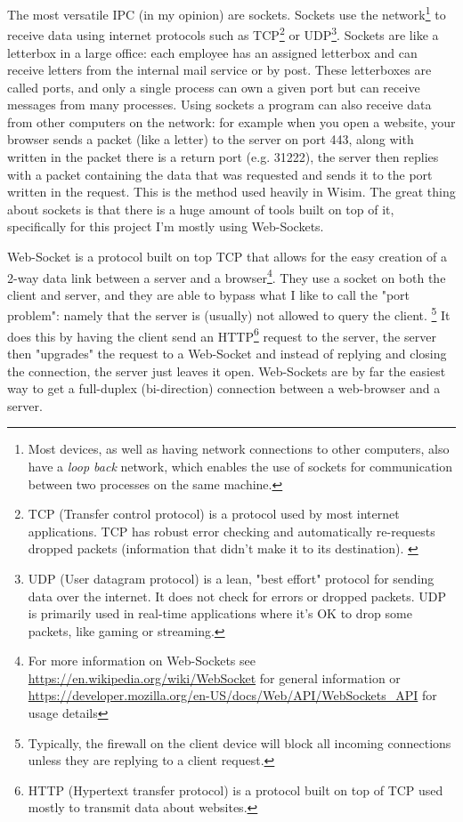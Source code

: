 The most versatile IPC (in my opinion) are sockets. Sockets use the network\footnote{Most devices, as well as having network
	connections to other computers, also have a \textit{loop back} network, which enables the use of sockets for communication
	between two processes on the same machine.} to receive data using internet protocols such as TCP\footnote{TCP (Transfer
	control protocol) is a protocol used by most internet applications. TCP has robust error checking and automatically
	re-requests dropped packets (information that didn't make it to its destination). \label{footnote:tcp}} or
UDP\footnote{UDP (User datagram protocol) is a lean, "best effort" protocol for sending data over the internet.
	It does not check for errors or dropped packets. UDP is primarily used in real-time applications where it's OK to
	drop some packets, like gaming or streaming.}.
Sockets are like a letterbox in a large office: each employee has an assigned letterbox and can receive letters
from the internal mail service or by post. These letterboxes are called ports, and only a single process can own a given
port but can receive messages from many processes. Using sockets a program can also receive data from other computers on the
network: for example when you open a website, your browser sends a packet (like a letter) to the server on port 443, along with
written in the packet there is a return port (e.g. 31222), the server then replies with a packet containing the data that was
requested and sends it to the port written in the request. This is the method used heavily in Wisim. The great thing about sockets is
that there is a huge amount of tools built on top of it, specifically for this project I'm mostly using Web-Sockets.

Web-Socket is a protocol built on top TCP that allows for the easy creation of a 2-way data link between a server and
a browser\footnote{For more information on Web-Sockets see \href{https://en.wikipedia.org/wiki/WebSocket}{https://en.wikipedia.org/wiki/WebSocket}
	for general information or \href{https://developer.mozilla.org/en-US/docs/Web/API/WebSockets\_API}{https://developer.mozilla.org/en-US/docs/Web/API/WebSockets\_API}
	for usage details}. They use a socket on both the client and server, and they are able to bypass what I like to call the "port
problem": namely that the server is (usually) not allowed to query the client. \footnote{Typically, the firewall on the
	client device will block all incoming connections unless they are replying to a client request.} It does this by having
the client send an HTTP\footnote{HTTP (Hypertext transfer protocol) is a protocol built on top of TCP used
	mostly to transmit data about websites.\label{footnote:http}} request to the server, the server then "upgrades" the request to a Web-Socket and instead of
replying and closing the connection, the server just leaves it open. Web-Sockets are by far the easiest way to get a full-duplex
(bi-direction) connection between a web-browser and a server.

